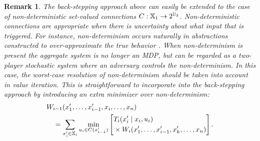 \documentclass[conference]{IEEEtran}
\renewcommand{\cite}[1]{\citep{#1}}
\newtheorem{remark}{Remark}
\begin{document}


\begin{remark}
	The back-stepping approach above can easily be extended to the case of \emph{non-deterministic} set-valued connections $C : \mathbb{X}_1 \rightarrow 2^{\mathbb{U}_2}$. Non-deterministic connections are appropriate when there is uncertainty about what input that is triggered. For instance, non-determinism occurs naturally in abstractions constructed to over-approximate the true behavior \cite{Haesaert18}. When non-determinism is present the aggregate system is no longer an MDP, but can be regarded as a two-player stochastic system where an adversary controls the non-determinism. In this case, the worst-case resolution of non-determinism should be taken into account in value iteration. This is straightforward to incorporate into the back-stepping approach by introducing an extra minimizer over non-determinism:
	\begin{equation*}
	\begin{aligned}
	  & W_{i-1}(x_1', \ldots, x_{i-1}', x_i, \ldots, x_n) \\
	  & \quad = \sum_{x_{i}' \in \mathbb{X}_{i}} \min_{u_i \in C(x_{i-1}')} \left[ \begin{aligned} & T_{i} (x_{i}' \mid x_{i}, u_i) \\ 
	   & \times W_{i} (x_1', \ldots, x_{i-1}', x_k', \ldots, x_n)
	    \end{aligned} \right].
	\end{aligned}
	\end{equation*}
\end{remark}


\end{document}
